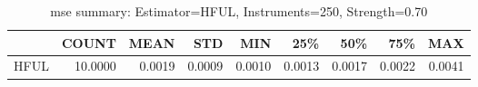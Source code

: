 \begin{table}[ht]
\centering
\caption{mse summary: Estimator=HFUL, Instruments=250, Strength=0.70}
\begin{tabular}{lrrrrrrrr}
\toprule
 & COUNT & MEAN & STD & MIN & 25\% & 50\% & 75\% & MAX \\
\midrule
HFUL & 10.0000 & 0.0019 & 0.0009 & 0.0010 & 0.0013 & 0.0017 & 0.0022 & 0.0041 \\
\bottomrule
\end{tabular}
\end{table}
